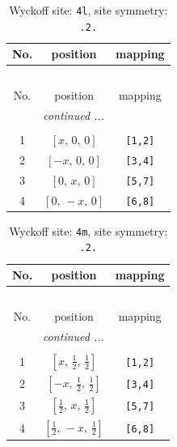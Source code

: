 \documentclass[fleqn,8pt]{jsarticle}
\begin{document}
\renewcommand{\arraystretch}{1.2}
\begin{longtable}{ccc}
\caption{Wyckoff site: {\tt 4l}, site symmetry: {\tt .2.}}
 \\
 \hline \hline
No. & position & mapping \\ \hline \endfirsthead

\multicolumn{2}{l}{\tablename\ \thetable{}} \\
 \hline \hline
No. & position & mapping \\ \hline \endhead

 \hline \hline
\multicolumn{2}{r}{\footnotesize\it continued ...} \\ \endfoot

 \hline \hline
\multicolumn{2}{r}{} \\ \endlastfoot

1 & $\left[ x,\, 0,\, 0 \right]$ & {\tt [1,2]} \\ \hline
2 & $\left[ - x,\, 0,\, 0 \right]$ & {\tt [3,4]} \\ \hline
3 & $\left[ 0,\, x,\, 0 \right]$ & {\tt [5,7]} \\ \hline
4 & $\left[ 0,\, - x,\, 0 \right]$ & {\tt [6,8]} \\
\end{longtable}
\renewcommand{\arraystretch}{1.2}
\begin{longtable}{ccc}
\caption{Wyckoff site: {\tt 4m}, site symmetry: {\tt .2.}}
 \\
 \hline \hline
No. & position & mapping \\ \hline \endfirsthead

\multicolumn{2}{l}{\tablename\ \thetable{}} \\
 \hline \hline
No. & position & mapping \\ \hline \endhead

 \hline \hline
\multicolumn{2}{r}{\footnotesize\it continued ...} \\ \endfoot

 \hline \hline
\multicolumn{2}{r}{} \\ \endlastfoot

1 & $\left[ x,\, \frac{1}{2},\, \frac{1}{2} \right]$ & {\tt [1,2]} \\ \hline
2 & $\left[ - x,\, \frac{1}{2},\, \frac{1}{2} \right]$ & {\tt [3,4]} \\ \hline
3 & $\left[ \frac{1}{2},\, x,\, \frac{1}{2} \right]$ & {\tt [5,7]} \\ \hline
4 & $\left[ \frac{1}{2},\, - x,\, \frac{1}{2} \right]$ & {\tt [6,8]} \\
\end{longtable}
\end{document}
